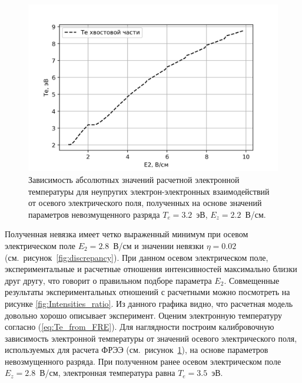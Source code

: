 \begin{figure}[t]
  \centering
  \includegraphics[width=16cm]{figures/Te_tail}
  \caption{Зависимость абсолютных значений расчетной электронной температуры для неупругих электрон-электронных
  взаимодействий от осевого электрического поля, полученных на основе значений параметров невозмущенного разряда $T_e = 3.2$~эВ, $E_z = 2.2$~В/см.}
  \label{fig:Te_tail}
\end{figure}

Полученная невязка имеет четко выраженный минимум при осевом электрическом
поле $E_2 = 2.8$~В/см и значении невязки $\eta = 0.02$ (см.~рисунок~\ref{fig:discrepancy}).
При данном осевом электрическом поле, экспериментальные и расчетные отношения интенсивностей максимально близки друг другу,
что говорит о правильном подборе параметра $E_2$.
Совмещенные результаты экспериментальных отношений с расчетными можно посмотреть на рисунке \ref{fig:Intensities_ratio}.
Из данного графика видно, что расчетная модель довольно хорошо описывает эксперимент. Оценим электронную температуру
согласно (\ref{eq:Te_from_FRE}). Для наглядности построим калибровочную зависимость электронной температуры от
значений осевого электрического поля, используемых для расчета ФРЭЭ (см.~рисунок~\ref{fig:Te_tail}), на основе
параметров невозмущенного разряда. При полученном ранее осевом электрическом поле $E_z = 2.8$~В/см, электронная температура
равна $T_e = 3.5$~эВ.

